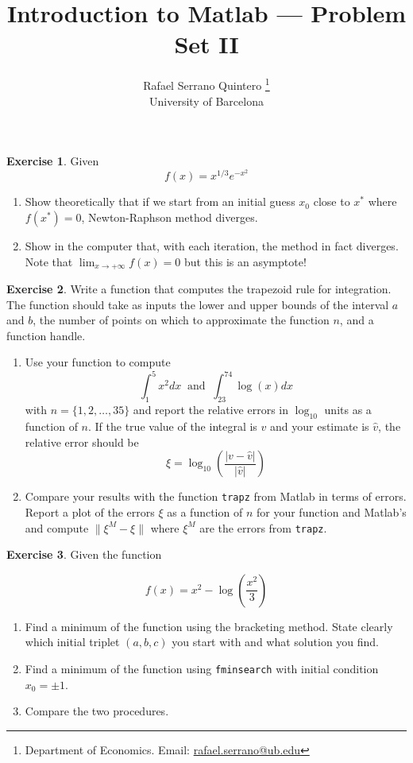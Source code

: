 \documentclass[a4paper,11pt]{article}
\title{\textbf{Introduction to Matlab --- Problem Set II}}
\author{Rafael Serrano Quintero
\thanks{Department of Economics. Email: \href{mailto:rafael.serrano@ub.edu}{rafael.serrano@ub.edu}} \\
University of Barcelona \\}
\date{}
\theoremstyle{definition}
\newtheorem{exercise}{Exercise}
\begin{document}
\VerbatimFootnotes

\maketitle

\begin{exercise}
Given
\[
f(x) = x^{1/3}e^{-x^2}
\]

\begin{enumerate}
    \item Show theoretically that if we start from an initial guess $x_0$ close to $x^*$ where $f(x^*) = 0$, Newton-Raphson method diverges.
    \item Show in the computer that, with each iteration, the method in fact diverges. Note that $\displaystyle\lim_{x\rightarrow +\infty}f(x) = 0$ but this is an asymptote!
\end{enumerate}
\end{exercise}

\begin{exercise}
Write a function that computes the trapezoid rule for integration. The function should take as inputs the lower and upper bounds of the interval $a$ and $b$, the number of points on which to approximate the function $n$, and a function handle.
\begin{enumerate}
    \item Use your function to compute
    \[
    \int^5_1 x^2 dx \ \text{ and } \ \int^{74}_{23} \log(x) dx
    \]
    with $n = \{1,2,\ldots,35\}$ and report the relative errors in $\log_{10}$ units as a function of $n$. If the true value of the integral is $v$ and your estimate is $\hat{v}$, the relative error should be
    \[
    \xi = \log_{10}\left(\frac{\lvert v - \hat{v}\rvert}{\lvert \hat{v}\rvert}\right)
    \]
    \item Compare your results with the function \verb;trapz; from Matlab in terms of errors. Report a plot of the errors $\xi$ as a function of $n$ for your function and Matlab's and compute $\lVert \xi^M - \xi \rVert$ where $\xi^M$ are the errors from \verb;trapz;.
\end{enumerate}
\end{exercise}

\begin{exercise}
Given the function 

\[
f(x) = x^2 - \log\left(\frac{x^2}{3}\right)
\]

\begin{enumerate}
    \item Find a minimum of the function using the bracketing method. State clearly which initial triplet $(a,b,c)$ you start with and what solution you find.
    \item Find a minimum of the function using \verb;fminsearch; with initial condition $x_0 = \pm 1$.
    \item Compare the two procedures.
\end{enumerate}
\end{exercise}
\end{document}
